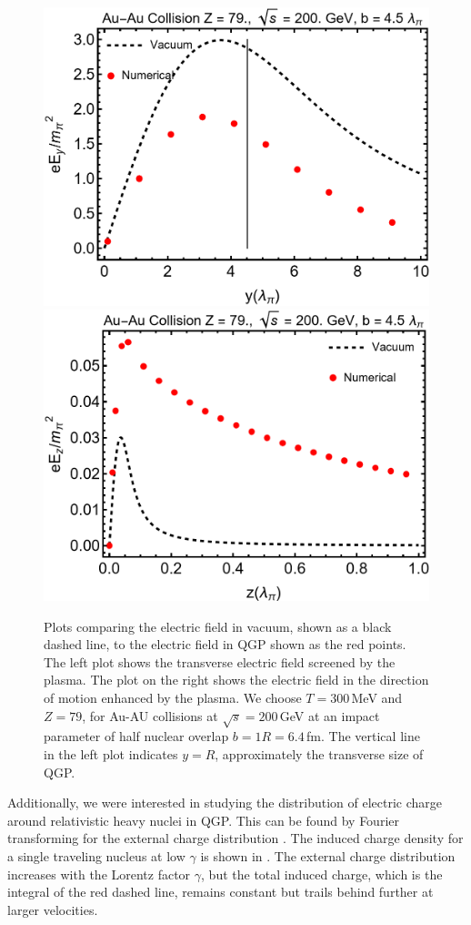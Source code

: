 \phantom{Phantom text}
\begin{figure}[ht]
\centering
\includegraphics[width=0.45\linewidth]{plots/chap02QCD/Eyy.png}
\hspace{0.05\linewidth}
\includegraphics[width=0.45\linewidth]{plots/chap02QCD/Ezz.png}
\caption{Plots comparing the electric field in vacuum, shown as a black dashed line, to the electric field in QGP shown as the red points. The left plot shows the transverse electric field screened by the plasma. The plot on the right shows the electric field in the direction of motion enhanced by the plasma. We choose $T = 300$\,MeV and $Z=79$, for Au-AU collisions at $\sqrt{s} = 200$\,GeV at an impact parameter of half nuclear overlap $b = 1 R = 6.4\,$fm. The vertical line in the left plot indicates $ y = R$, approximately the transverse size of QGP. \label{fig:efcomp}}
\end{figure}

Additionally, we were interested in studying the distribution of electric charge around relativistic heavy nuclei in QGP. This can be found by Fourier transforming  for the external charge distribution . The induced charge density for a single traveling nucleus at low $\gamma$ is shown in . The external charge distribution increases with the Lorentz factor $\gamma$, but the total induced charge, which is the integral of the red dashed line, remains constant but trails behind further at larger velocities.

